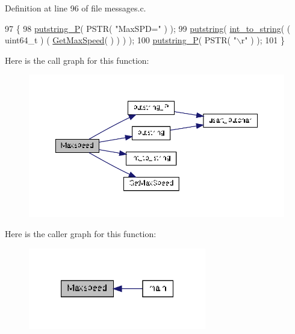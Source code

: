 Definition at line 96 of file messages.\-c.


\begin{DoxyCode}
97 \{
98     \hyperlink{group__biba__utils_gaf1b54c4c5b890362b485636395859b3d}{putstring\_P}( PSTR( \textcolor{stringliteral}{"MaxSPD="} ) );
99     \hyperlink{group__biba__utils_ga354be7728c1265a82ba2510f1800cea4}{putstring}( \hyperlink{group__biba__utils_ga3d33c2ff89043a4bf00d652d182dfc27}{int\_to\_string}( ( uint64\_t ) ( \hyperlink{group__biba__drv_ga356f958c8327643ae22d240493ae7747}{GetMaxSpeed}( ) ) ) );
100     \hyperlink{group__biba__utils_gaf1b54c4c5b890362b485636395859b3d}{putstring\_P}( PSTR( \textcolor{stringliteral}{"\(\backslash\)r"} ) );
101 \}
\end{DoxyCode}


Here is the call graph for this function\-:
\nopagebreak
\begin{figure}[H]
\begin{center}
\leavevmode
\includegraphics[width=350pt]{group__biba__messges_gaa5f13f30a59a97aca9198b06a0c90112_cgraph}
\end{center}
\end{figure}




Here is the caller graph for this function\-:
\nopagebreak
\begin{figure}[H]
\begin{center}
\leavevmode
\includegraphics[width=220pt]{group__biba__messges_gaa5f13f30a59a97aca9198b06a0c90112_icgraph}
\end{center}
\end{figure}



